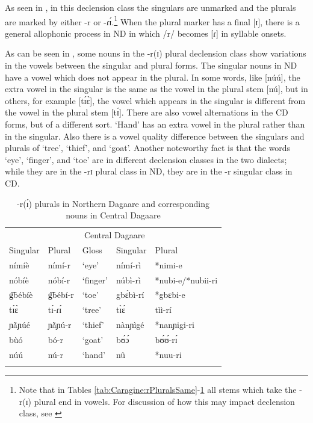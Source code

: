 \documentclass[output=paper,colorlinks,citecolor=brown,
]{langscibook}
\begin{document}
As seen in , in this declension class the singulars are unmarked and the plurals are marked by either -r or -ɾɪ́.\footnote{Note that in Tables \ref{tab:Caragine:rPluralsSame}-\ref{tab:Caragine:rPluralsChange} all stems which take the -r(ɪ) plural end in vowels. For discussion of how this may impact declension class, see \citet{Pruett}} When the plural marker has a final [ɪ], there is a general allophonic process in ND in which /r/ becomes [ɾ] in syllable onsets. 

As can be seen in , some nouns in the -r(ɪ) plural declension class show variations in the vowels between the singular and plural forms. The singular nouns in ND have a vowel which does not appear in the plural. In some words, like [núú], the extra vowel in the singular is the same as the vowel in the plural stem [nú], but in others, for example [tɪ́ɛ̀], the vowel which appears in the singular is different from the vowel in the plural stem [tɪ́]. There are also vowel alternations in the CD forms, but of a different sort. `Hand' has an extra vowel in the plural rather than in the singular. Also there is a vowel quality difference between the singulars and plurals of `tree', `thief', and `goat'. 
Another noteworthy fact is that the words `eye', `finger', and `toe' are in different declension classes in the two dialects; while they are in the -rɪ plural class in ND, they are in the -r singular class in CD.

\begin{table}

  \caption{-r(ɪ́) plurals in Northern Dagaare and corresponding nouns in Central Dagaare }
  \label{tab:Caragine:rPluralsChange}
  
\begin{tabular}{lllll}
\lsptoprule 
\multicolumn{2}{c}{Northern Dagaare} & \multicolumn{1}{c}{}& \multicolumn{2}{c}{Central Dagaare}\\
Singular & Plural & Gloss 
& Singular & Plural \\
\midrule\midrule
nímíè & nímí-r & `eye' & nímí-rì & *nimi-e\\
nóbíè & nóbí-r & `finger' & núbì-rì & *nubi-e/*nubii-ri\\
g͡bébíè & g͡bébí-r & `toe' & gbɛ́bì-rí & *gbɛbi-e\\
tɪ́ɛ̀ & tɪ́-ɾɪ́ & `tree' & tɪ̀ɛ́ & tìì-rí \citep{bodomoStructure1997}\\
ɲã̀ɲúé & ɲã̀ɲú-r & `thief' & nànɲìgé & *nanɲigi-ri\\
bùó & bó-r & `goat' &bʊ́ɔ́& bʊ́ʊ́-rɪ́ \\
núú & nú-r & `hand' &nû& *nuu-ri\\
\lspbottomrule 

\end{tabular}
\end{table}
\end{document}
